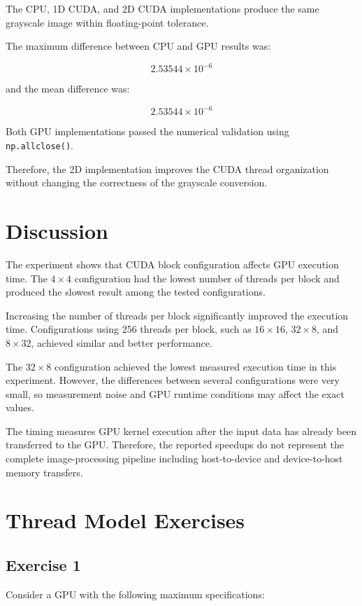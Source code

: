 \documentclass[11pt]{article}
\begin{document}
The CPU, 1D CUDA, and 2D CUDA implementations produce the same grayscale
image within floating-point tolerance.

The maximum difference between CPU and GPU results was:

\[
2.53544\times10^{-6}
\]

and the mean difference was:

\[
2.53544\times10^{-6}
\]

Both GPU implementations passed the numerical validation using
\texttt{np.allclose()}.

Therefore, the 2D implementation improves the CUDA thread organization
without changing the correctness of the grayscale conversion.

\section{Discussion}

The experiment shows that CUDA block configuration affects GPU execution
time. The $4\times4$ configuration had the lowest number of threads per
block and produced the slowest result among the tested configurations.

Increasing the number of threads per block significantly improved the
execution time. Configurations using 256 threads per block, such as
$16\times16$, $32\times8$, and $8\times32$, achieved similar and better
performance.

The $32\times8$ configuration achieved the lowest measured execution time
in this experiment. However, the differences between several configurations
were very small, so measurement noise and GPU runtime conditions may affect
the exact values.

The timing measures GPU kernel execution after the input data has already
been transferred to the GPU. Therefore, the reported speedups do not
represent the complete image-processing pipeline including host-to-device
and device-to-host memory transfers.

\section{Thread Model Exercises}

\subsection{Exercise 1}

Consider a GPU with the following maximum specifications:
\end{document}

